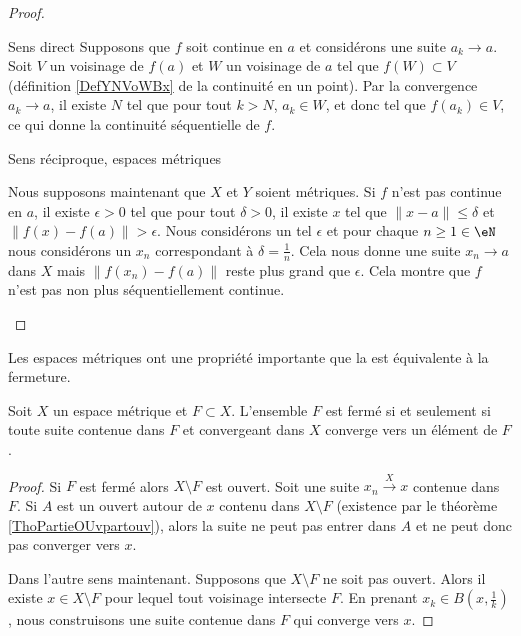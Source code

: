 \begin{proof}
    \begin{subproof}
    \item[Sens direct]
        Supposons que \( f\) soit continue en \( a\) et considérons une suite \( a_k\to a\). Soit \( V\) un voisinage de \( f(a)\) et \( W\) un voisinage de \( a\) tel que \( f(W)\subset V\) (définition \ref{DefYNVoWBx} de la continuité en un point). Par la convergence \( a_k\to a\),  il existe \( N\) tel que pour tout \( k>N\), \( a_k\in W\), et donc tel que \( f(a_k)\in V\), ce qui donne la continuité séquentielle de \( f\).
    \item[Sens réciproque, espaces métriques]

        Nous supposons maintenant que \( X\) et \( Y\) soient métriques. Si \( f\) n'est pas continue en \( a\), il existe \( \epsilon>0\) tel que pour tout \( \delta>0\), il existe \( x\) tel que \( \| x-a \|\leq\delta\) et \( \| f(x)-f(a) \|>\epsilon\). Nous considérons un tel \( \epsilon\) et pour chaque \( n\geq1\in \eN\) nous considérons un \( x_n\) correspondant à \( \delta=\frac{1}{ n }\). Cela nous donne une suite \( x_n\to a\) dans \( X\) mais \( \| f(x_n) -f(a)\|\) reste plus grand que \( \epsilon\). Cela montre que \( f\) n'est pas non plus séquentiellement continue.
    \end{subproof}
\end{proof}

Les espaces métriques ont une propriété importante que la  est équivalente à la fermeture.
\begin{proposition}    \label{PropLFBXIjt}
    Soit \( X\) un espace métrique et \( F\subset X\). L'ensemble \( F\) est fermé si et seulement si toute suite contenue dans \( F\) et convergeant dans \( X\) converge vers un élément de \( F\).
\end{proposition}

\begin{proof}
    Si \( F\) est fermé alors \( X\setminus F\) est ouvert. Soit une suite \( x_n\stackrel{X}{\longrightarrow}x\) contenue dans \( F\). Si \( A\) est un ouvert autour de \( x\) contenu dans \( X\setminus F\) (existence par le théorème \ref{ThoPartieOUvpartouv}), alors la suite ne peut pas entrer dans \( A\) et ne peut donc pas converger vers \( x\).

    Dans l'autre sens maintenant. Supposons que \( X\setminus F\) ne soit pas ouvert. Alors il existe \( x\in X\setminus F\) pour lequel tout voisinage intersecte \( F\). En prenant \( x_k\in B(x,\frac{1}{ k })\), nous construisons une suite contenue dans \( F\) qui converge vers \( x\).
\end{proof}

